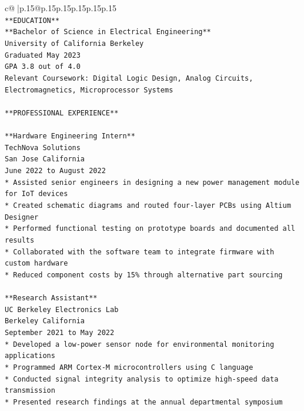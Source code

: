 \documentclass{article}
\begin{document}
{\begin{supertabular}{c@{$\;$}|p{.15\linewidth}@{}p{.15\linewidth}p{.15\linewidth}p{.15\linewidth}p{.15\linewidth}p{.15\linewidth}}
{{{\\ 
\texttt{**EDUCATION**} \\
\texttt{**Bachelor of Science in Electrical Engineering**} \\
\texttt{University of California Berkeley} \\
\texttt{Graduated May 2023} \\
\texttt{GPA 3.8 out of 4.0} \\
\texttt{Relevant Coursework: Digital Logic Design, Analog Circuits, Electromagnetics, Microprocessor Systems} \\
\\ 
\texttt{**PROFESSIONAL EXPERIENCE**} \\
\\ 
\texttt{**Hardware Engineering Intern**} \\
\texttt{TechNova Solutions} \\
\texttt{San Jose California} \\
\texttt{June 2022 to August 2022} \\
\texttt{*   Assisted senior engineers in designing a new power management module for IoT devices} \\
\texttt{*   Created schematic diagrams and routed four{-}layer PCBs using Altium Designer} \\
\texttt{*   Performed functional testing on prototype boards and documented all results} \\
\texttt{*   Collaborated with the software team to integrate firmware with custom hardware} \\
\texttt{*   Reduced component costs by 15\% through alternative part sourcing} \\
\\ 
\texttt{**Research Assistant**} \\
\texttt{UC Berkeley Electronics Lab} \\
\texttt{Berkeley California} \\
\texttt{September 2021 to May 2022} \\
\texttt{*   Developed a low{-}power sensor node for environmental monitoring applications} \\
\texttt{*   Programmed ARM Cortex{-}M microcontrollers using C language} \\
\texttt{*   Conducted signal integrity analysis to optimize high{-}speed data transmission} \\
\texttt{*   Presented research findings at the annual departmental symposium} \\
\\ 
}}}
\end{supertabular}}
\end{document}
